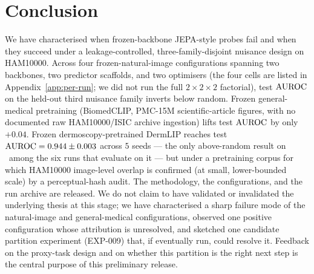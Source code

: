 \section{Conclusion}
\label{sec:conclusion}

We have characterised when frozen-backbone JEPA-style probes fail and when
they succeed under a leakage-controlled, three-family-disjoint nuisance
design on HAM10000. Across four frozen-natural-image configurations
spanning two backbones, two predictor scaffolds, and two optimisers
(the four cells are listed in Appendix~\ref{app:per-run}; we did not
run the full $2 \times 2 \times 2$ factorial), test $\mathrm{AUROC}$ on the
held-out third nuisance family inverts below random. Frozen general-
medical pretraining (BiomedCLIP, PMC-15M scientific-article figures,
with no documented raw HAM10000/ISIC archive ingestion) lifts test
$\mathrm{AUROC}$ by only $+0.04$. Frozen dermoscopy-pretrained DermLIP reaches test $\mathrm{AUROC} = 0.944 \pm 0.003$
across $5$ seeds --- the only above-random result on \strongholdtwo\ among
the six runs that evaluate on it --- but under
a pretraining corpus for which HAM10000 image-level overlap is confirmed (at
small, lower-bounded scale) by a perceptual-hash audit. The methodology,
the configurations, and the run archive are released. We do not claim to have
validated or invalidated the underlying thesis at this stage; we have
characterised a sharp failure mode of the natural-image and general-medical
configurations, observed one positive configuration whose attribution is
unresolved, and sketched one candidate partition experiment (EXP-009)
that, if eventually run, could resolve it. Feedback on the proxy-task
design and on whether this partition is the right next step is the
central purpose of this preliminary release.
